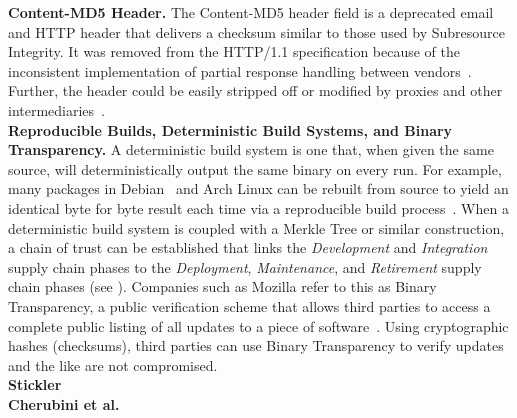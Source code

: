 \noindent\textbf{Content-MD5 Header.} The Content-MD5 header field is a
deprecated email and HTTP header that delivers a checksum similar to those used
by Subresource Integrity. It was removed from the HTTP/1.1 specification because
of the inconsistent implementation of partial response handling between
vendors~\cite{HTTP1.1}. Further, the header could be easily stripped off or
modified by proxies and other intermediaries~\cite{MD5Header}. \\

\noindent\textbf{Reproducible Builds, Deterministic Build Systems, and Binary
Transparency.} A deterministic build system is one that, when given the same
source, will deterministically output the same binary on every run. For example,
many packages in Debian~\cite{ReproBuildsDebian} and Arch Linux can be rebuilt
from source to yield an identical byte for byte result each time via a
reproducible build process~\cite{ReproBuilds}. When a deterministic build system
is coupled with a Merkle Tree or similar construction, a chain of trust can be
established that links the \emph{Development} and \emph{Integration} supply
chain phases to the \emph{Deployment}, \emph{Maintenance}, and \emph{Retirement}
supply chain phases (see ). Companies such as Mozilla refer to
this as Binary Transparency, a public verification scheme that allows third
parties to access a complete public listing of all updates to a piece of
software~\cite{BinaryTransparency}. Using cryptographic hashes (checksums),
third parties can use Binary Transparency to verify updates and the like are not
compromised. \\

\noindent\textbf{Stickler}  \\

\noindent\textbf{Cherubini et al.} 
